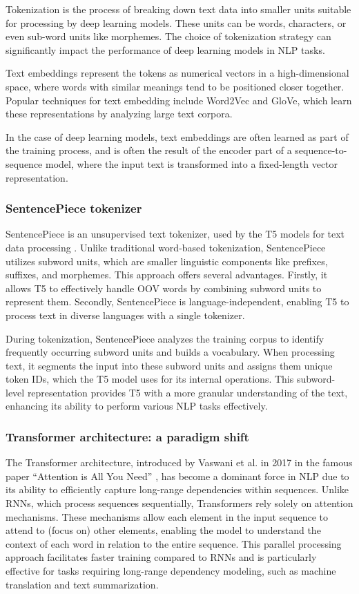 \documentclass[12.5pt]{article}
\begin{document}
Tokenization is the process of breaking down text data into smaller units suitable for processing by deep learning models. These units can be words, characters, or even sub-word units like morphemes. The choice of tokenization strategy can significantly impact the performance of deep learning models in NLP tasks.

Text embeddings represent the tokens as numerical vectors in a high-dimensional space, where words with similar meanings tend to be positioned closer together. Popular techniques for text embedding include Word2Vec and GloVe, which learn these representations by analyzing large text corpora.

In the case of deep learning models, text embeddings are often learned as part of the training process, and is often the result of the encoder part of a sequence-to-sequence model, where the input text is transformed into a fixed-length vector representation.

\subsubsection{SentencePiece tokenizer}

SentencePiece is an unsupervised text tokenizer, used by the T5 models for text data processing \cite{Kudo2018}. Unlike traditional word-based tokenization, SentencePiece utilizes subword units, which are smaller linguistic components like prefixes, suffixes, and morphemes. This approach offers several advantages. Firstly, it allows T5 to effectively handle OOV words by combining subword units to represent them. Secondly, SentencePiece is language-independent, enabling T5 to process text in diverse languages with a single tokenizer.

During tokenization, SentencePiece analyzes the training corpus to identify frequently occurring subword units and builds a vocabulary. When processing text, it segments the input into these subword units and assigns them unique token IDs, which the T5 model uses for its internal operations. This subword-level representation provides T5 with a more granular understanding of the text, enhancing its ability to perform various NLP tasks effectively.

\subsubsection{Transformer architecture: a paradigm shift}

The Transformer architecture, introduced by Vaswani et al. in 2017 in the famous paper “Attention is All You Need” \cite{Vaswani2017}, has become a dominant force in NLP due to its ability to efficiently capture long-range dependencies within sequences. Unlike RNNs, which process sequences sequentially, Transformers rely solely on attention mechanisms. These mechanisms allow each element in the input sequence to attend to (focus on) other elements, enabling the model to understand the context of each word in relation to the entire sequence. This parallel processing approach facilitates faster training compared to RNNs and is particularly effective for tasks requiring long-range dependency modeling, such as machine translation and text summarization.
\end{document}
